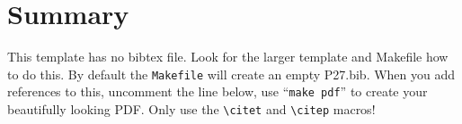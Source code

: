 \documentclass[11pt,twoside]{article}
\begin{document}
\section{Summary}

This template has no bibtex file.  Look for the larger template and
Makefile how to do this. By default the {\tt Makefile} will create an
empty P27.bib. When you add references to this, uncomment the
line \verb++ below, use ``{\tt make pdf}'' to create
your beautifully looking PDF. Only use the
\verb"\citet" and \verb"\citep" macros!






\end{document}
